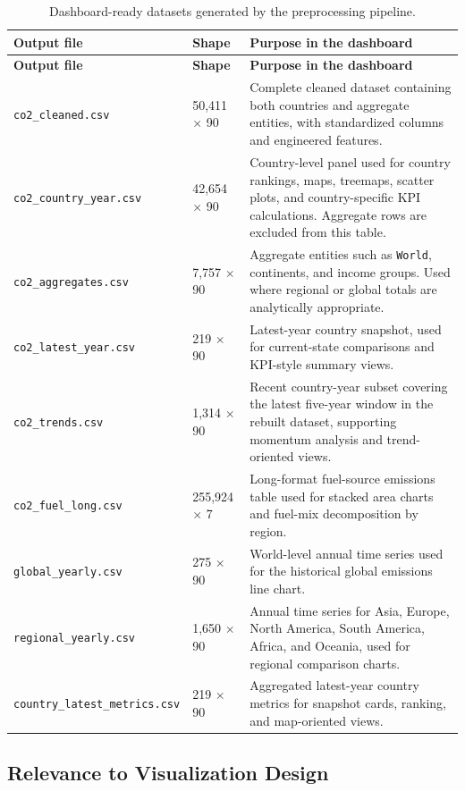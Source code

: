 \documentclass[a4paper,12pt]{article}
\begin{document}
\begin{longtable}{L{0.31\textwidth} L{0.14\textwidth} L{0.45\textwidth}}
\caption{Dashboard-ready datasets generated by the preprocessing pipeline.}
\label{tab:preprocessing-outputs}\\
\toprule
\textbf{Output file} & \textbf{Shape} & \textbf{Purpose in the dashboard} \\
\midrule
\endfirsthead
\toprule
\textbf{Output file} & \textbf{Shape} & \textbf{Purpose in the dashboard} \\
\midrule
\endhead
\texttt{co2\_cleaned.csv} & 50,411 $\times$ 90 &
Complete cleaned dataset containing both countries and aggregate entities, with standardized
columns and engineered features. \\
\texttt{co2\_country\_year.csv} & 42,654 $\times$ 90 &
Country-level panel used for country rankings, maps, treemaps, scatter plots, and
country-specific KPI calculations. Aggregate rows are excluded from this table. \\
\texttt{co2\_aggregates.csv} & 7,757 $\times$ 90 &
Aggregate entities such as \texttt{World}, continents, and income groups. Used where
regional or global totals are analytically appropriate. \\
\texttt{co2\_latest\_year.csv} & 219 $\times$ 90 &
Latest-year country snapshot, used for current-state comparisons and KPI-style summary
views. \\
\texttt{co2\_trends.csv} & 1,314 $\times$ 90 &
Recent country-year subset covering the latest five-year window in the rebuilt dataset,
supporting momentum analysis and trend-oriented views. \\
\texttt{co2\_fuel\_long.csv} & 255,924 $\times$ 7 &
Long-format fuel-source emissions table used for stacked area charts and fuel-mix
decomposition by region. \\
\texttt{global\_yearly.csv} & 275 $\times$ 90 &
World-level annual time series used for the historical global emissions line chart. \\
\texttt{regional\_yearly.csv} & 1,650 $\times$ 90 &
Annual time series for Asia, Europe, North America, South America, Africa, and Oceania,
used for regional comparison charts. \\
\texttt{country\_latest\_metrics.csv} & 219 $\times$ 90 &
Aggregated latest-year country metrics for snapshot cards, ranking, and map-oriented
views. \\
\bottomrule
\end{longtable}

\subsection{Relevance to Visualization Design}
\end{document}
